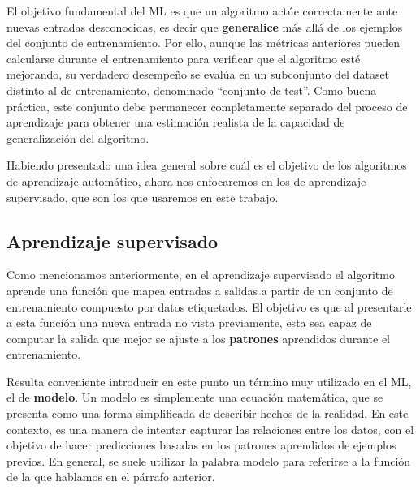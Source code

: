 \documentclass[../../main.tex]{subfiles}
\begin{document}
El objetivo fundamental del ML es que un algoritmo actúe correctamente ante nuevas
entradas desconocidas, es decir que \textbf{generalice} más allá de los ejemplos del
conjunto de entrenamiento. Por ello, aunque las métricas anteriores pueden calcularse
durante el entrenamiento para verificar que el algoritmo esté mejorando, su verdadero
desempeño se evalúa en un subconjunto del dataset distinto al de entrenamiento, denominado
``conjunto de test''. Como buena práctica, este conjunto debe permanecer completamente
separado del proceso de aprendizaje para obtener una estimación realista de la capacidad
de generalización del algoritmo.

\bigskip
Habiendo presentado una idea general sobre cuál es el objetivo de los algoritmos de
aprendizaje automático, ahora nos enfocaremos en los de aprendizaje supervisado, que son
los que usaremos en este trabajo.

\subsection{Aprendizaje supervisado}
Como mencionamos anteriormente, en el aprendizaje supervisado el algoritmo aprende una
función que mapea entradas a salidas a partir de un conjunto de entrenamiento compuesto
por datos etiquetados. El objetivo es que al presentarle a esta función una nueva entrada
no vista previamente, esta sea capaz de computar la salida que mejor se ajuste a los
\textbf{patrones} aprendidos durante el entrenamiento.

Resulta conveniente introducir en este punto un término muy utilizado en el ML, el de
\textbf{modelo}. Un modelo es simplemente una ecuación matemática, que se presenta como
una forma simplificada de describir hechos de la realidad. En este contexto, es una
manera de intentar capturar las relaciones entre los datos, con el objetivo de hacer
predicciones basadas en los patrones aprendidos de ejemplos previos. En general, se suele
utilizar la palabra modelo para referirse a la función de la que hablamos en el párrafo
anterior.
\end{document}
